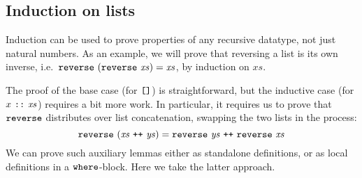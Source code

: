\documentclass[a4paper,UKenglish]{tufte-handout}
\theoremstyle{definition}
\newcommand\var[1]{\mathit{#1}}
\newcommand\fun[1]{{\AgdaFunction{#1}}}
\newcommand\con[1]{{\AgdaInductiveConstructor{#1}}}
\newcommand\keyw[1]{{\AgdaKeyword{#1}}}
\newcommand\nil{\con{[]}}
\newcommand\cons{\con{::}}
\begin{document}
\subsection{Induction on lists}

Induction can be used to prove properties of any recursive datatype,
not just natural numbers. As an example, we will prove that reversing
a list is its own inverse, i.e.~$\fun{reverse}\ (\fun{reverse}\
\var{xs}) = \var{xs}$, by induction on $\var{xs}$.

The proof of the base case (for $\nil$) is straightforward, but
the inductive case (for $x\ \cons\ \var{xs}$) requires a bit more
work. In particular, it requires us to prove that $\fun{reverse}$
distributes over list concatenation, swapping the two lists in the
process:
\[
\fun{reverse}\ (\var{xs}\ \fun{++}\ \var{ys})
  = \fun{reverse}\ \var{ys}\ \fun{++}\ \fun{reverse}\ \var{xs}
\]
We can prove such auxiliary lemmas either as standalone definitions,
or as local definitions in a $\keyw{where}$-block. Here we take the
latter approach.
\end{document}
